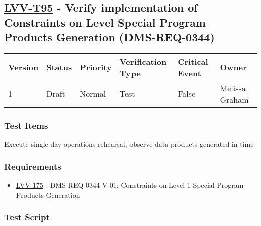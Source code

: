 \hypertarget{lvv-t95---verify-implementation-of-constraints-on-level-special-program-products-generation-dms-req-0344}{%
\subsection{\texorpdfstring{\href{https://jira.lsstcorp.org/secure/Tests.jspa\#/testCase/LVV-T95}{LVV-T95}
- Verify implementation of Constraints on Level Special Program Products
Generation
(DMS-REQ-0344)}{LVV-T95 - Verify implementation of Constraints on Level Special Program Products Generation (DMS-REQ-0344)}}\label{lvv-t95---verify-implementation-of-constraints-on-level-special-program-products-generation-dms-req-0344}}

\begin{longtable}[]{@{}llllll@{}}
\toprule
Version & Status & Priority & Verification Type & Critical Event &
Owner\tabularnewline
\midrule
\endhead
1 & Draft & Normal & Test & False & Melissa Graham\tabularnewline
\bottomrule
\end{longtable}

\hypertarget{test-items-71}{%
\subsubsection{Test Items}\label{test-items-71}}

Execute single-day operations rehearsal, observe data products generated
in time

\hypertarget{requirements-72}{%
\subsubsection{Requirements}\label{requirements-72}}

\begin{itemize}
\tightlist
\item
  \href{https://jira.lsstcorp.org/browse/LVV-175}{LVV-175} -
  DMS-REQ-0344-V-01: Constraints on Level 1 Special Program Products
  Generation
\end{itemize}

\hypertarget{test-script-72}{%
\subsubsection{Test Script}\label{test-script-72}}

